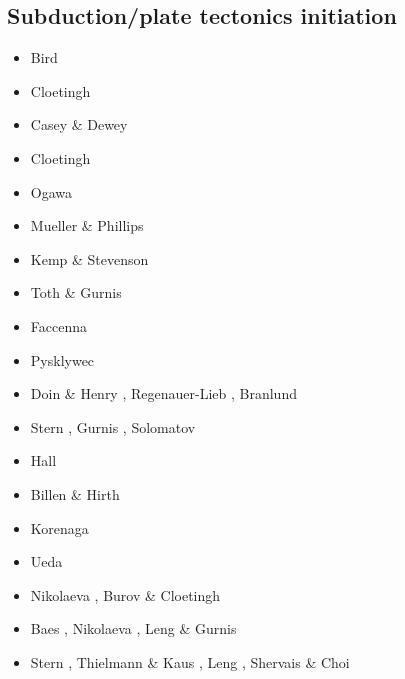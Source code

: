 \subsection{Subduction/plate tectonics initiation}

\begin{scriptsize}
\begin{itemize}
\item[\nineteenseventyeight] Bird \cite{bird78}
\item[\nineteeneightytwo] Cloetingh \cite{clwv82}
\item[\nineteeneightyfour] Casey \& Dewey \cite{cade84}
\item[\nineteeneightynine] Cloetingh \etal \cite{clwv89}
\item[\nineteenninety] Ogawa \cite{ogaw90} 
\item[\nineteenninetyone] Mueller \& Phillips \cite{muph91}
\item[\nineteenninetysix] Kemp \& Stevenson \cite{kest96}
\item[\nineteenninetyeight] Toth \& Gurnis \cite{togu98}
\item[\nineteenninetynine] Faccenna \etal \cite{fagd99}
\item[\twothousand] Pysklywec \etal \cite{pybf00}
\item[\twothousandone] Doin \& Henry \cite{dohe01}, Regenauer-Lieb \etal \cite{reyb01},
                 Branlund \etal \cite{brry01}
\item[\twothousandfour] Stern \cite{ster04}, Gurnis \etal \cite{guhl04}, 
                  Solomatov \cite{solo04}
\item[\twothousandthree] Hall \etal \cite{hags03}
\item[\twothousandfive] Billen \& Hirth \cite{bihi05}
\item[\twothousandseven] Korenaga \cite{kore07}
\item[\twothousandeight] Ueda \etal \cite{uegs08}
\item[\twothousandten] Nikolaeva \etal \cite{nigm10}, Burov \& Cloetingh \cite{bucl10}
\item[\twothousandeleven] Baes \etal \cite{bagw11}, Nikolaeva \etal \cite{nigm11}, 
                    Leng \& Gurnis \cite{legu11}
\item[\twothousandtwelve] Stern \etal \cite{stri12}, Thielmann \& Kaus \cite{thka12},
                    Leng \etal \cite{lega12}, Shervais \& Choi \cite{shch12}

\end{itemize}
\end{scriptsize}
